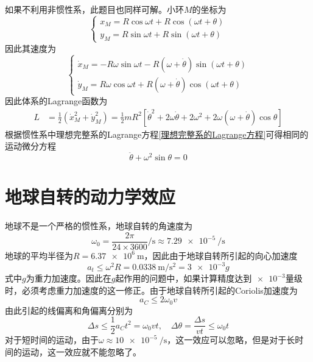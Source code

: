 \begin{solution}
如果不利用非惯性系，此题目也同样可解。小环$M$的坐标为
\begin{equation*}
	\begin{cases}
		x_M = R\cos \omega t + R\cos (\omega t+\theta) \\
		y_M = R\sin \omega t + R\sin (\omega t+\theta)
	\end{cases}
\end{equation*}
因此其速度为
\begin{equation*}
	\begin{cases}
		\dot{x}_M = -R\omega \sin \omega t - R(\omega + \dot{\theta}) \sin (\omega t+\theta) \\
		\dot{y}_M = R \omega \cos \omega t + R(\omega + \dot{\theta}) \cos (\omega t+\theta)
	\end{cases}
\end{equation*}
因此体系的Lagrange函数为
\begin{align*}
	L & = \frac12 (\dot{x}_M^2 + \dot{y}_M^2) = \frac12 mR^2 \left[\dot{\theta}^2 + 2\omega \dot{\theta} + 2\omega^2 + 2\omega(\omega+ \dot{\theta}) \cos \theta\right]
\end{align*}
根据惯性系中理想完整系的Lagrange方程\eqref{理想完整系的Lagrange方程}可得相同的运动微分方程
\begin{equation*}
	\ddot{\theta} + \omega^2 \sin \theta = 0
\end{equation*}
\end{solution}

\section{地球自转的动力学效应}

地球不是一个严格的惯性系，地球自转的角速度为
\begin{equation*}
	\omega_0 = \frac{2\pi}{24 \times 3600}\si{\per\second} \approx \SI{7.29e-5}{\per\second}
\end{equation*}
地球的平均半径为$R = \SI{6.37e6}{\meter}$，因此由于地球自转所引起的向心加速度
\begin{equation*}
	a_t \leqslant \omega^2 R = \SI[per-mode=symbol]{0.0338}{\meter\per\second\squared} = \num{3e-3} g
\end{equation*}
式中$g$为重力加速度。因此在$g$起作用的问题中，如果计算精度达到$\num{e-3}$量级时，必须考虑重力加速度的这一修正。由于地球自转所引起的Coriolis加速度为
\begin{equation*}
	a_C \leqslant 2\omega_0 v
\end{equation*}
由此引起的线偏离和角偏离分别为
\begin{equation*}
	\Delta s \leqslant \frac12 a_C t^2 = \omega_0 vt,\quad \Delta \theta = \frac{\Delta s}{vt} \leqslant \omega_0 t
\end{equation*}
对于短时间的运动，由于$\omega \approx \SI{10e-5}{\per\second}$，这一效应可以忽略，但是对于长时间的运动，这一效应就不能忽略了。

